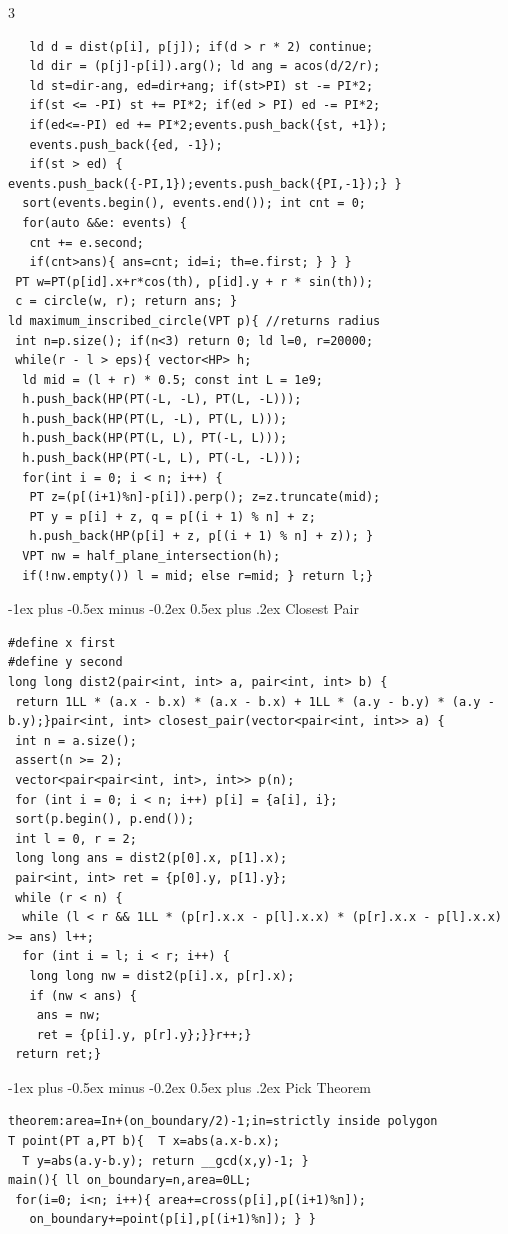 \documentclass[8pt,a4paper,onesided]{article}
\makeatletter
\renewcommand{\subsection}{\@startsection{subsection}{2}{0mm}
    {-1ex plus -0.5ex minus -0.2ex} %
    {0.5ex plus .2ex}                %
    {\normalfont\large\bfseries}}    %
\makeatother
\begin{document}
\begin{multicols}{3}
\begin{verbatim}
   ld d = dist(p[i], p[j]); if(d > r * 2) continue;
   ld dir = (p[j]-p[i]).arg(); ld ang = acos(d/2/r);
   ld st=dir-ang, ed=dir+ang; if(st>PI) st -= PI*2;
   if(st <= -PI) st += PI*2; if(ed > PI) ed -= PI*2;
   if(ed<=-PI) ed += PI*2;events.push_back({st, +1});
   events.push_back({ed, -1});
   if(st > ed) {
events.push_back({-PI,1});events.push_back({PI,-1});} }
  sort(events.begin(), events.end()); int cnt = 0;
  for(auto &&e: events) {
   cnt += e.second;
   if(cnt>ans){ ans=cnt; id=i; th=e.first; } } }
 PT w=PT(p[id].x+r*cos(th), p[id].y + r * sin(th));
 c = circle(w, r); return ans; }
ld maximum_inscribed_circle(VPT p){ //returns radius
 int n=p.size(); if(n<3) return 0; ld l=0, r=20000;
 while(r - l > eps){ vector<HP> h;
  ld mid = (l + r) * 0.5; const int L = 1e9;
  h.push_back(HP(PT(-L, -L), PT(L, -L)));
  h.push_back(HP(PT(L, -L), PT(L, L)));
  h.push_back(HP(PT(L, L), PT(-L, L)));
  h.push_back(HP(PT(-L, L), PT(-L, -L)));
  for(int i = 0; i < n; i++) {
   PT z=(p[(i+1)%n]-p[i]).perp(); z=z.truncate(mid);
   PT y = p[i] + z, q = p[(i + 1) % n] + z;
   h.push_back(HP(p[i] + z, p[(i + 1) % n] + z)); }
  VPT nw = half_plane_intersection(h);
  if(!nw.empty()) l = mid; else r=mid; } return l;}
\end{verbatim}
\subsection{Closest Pair}
\begin{verbatim}
#define x first
#define y second
long long dist2(pair<int, int> a, pair<int, int> b) {
 return 1LL * (a.x - b.x) * (a.x - b.x) + 1LL * (a.y - b.y) * (a.y - b.y);}pair<int, int> closest_pair(vector<pair<int, int>> a) {
 int n = a.size();
 assert(n >= 2);
 vector<pair<pair<int, int>, int>> p(n);
 for (int i = 0; i < n; i++) p[i] = {a[i], i};
 sort(p.begin(), p.end());
 int l = 0, r = 2;
 long long ans = dist2(p[0].x, p[1].x);
 pair<int, int> ret = {p[0].y, p[1].y};
 while (r < n) {
  while (l < r && 1LL * (p[r].x.x - p[l].x.x) * (p[r].x.x - p[l].x.x) >= ans) l++;
  for (int i = l; i < r; i++) {
   long long nw = dist2(p[i].x, p[r].x);
   if (nw < ans) {
    ans = nw;
    ret = {p[i].y, p[r].y};}}r++;}
 return ret;}
\end{verbatim}
\subsection{Pick Theorem}
\begin{verbatim}
theorem:area=In+(on_boundary/2)-1;in=strictly inside polygon
T point(PT a,PT b){  T x=abs(a.x-b.x);
  T y=abs(a.y-b.y); return __gcd(x,y)-1; }
main(){ ll on_boundary=n,area=0LL;
 for(i=0; i<n; i++){ area+=cross(p[i],p[(i+1)%n]);
   on_boundary+=point(p[i],p[(i+1)%n]); } }
\end{verbatim}

\end{multicols}
\end{document}
